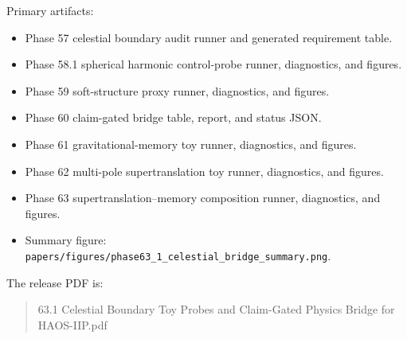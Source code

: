 \documentclass[11pt]{article}
\begin{document}
Primary artifacts:
\begin{itemize}
\item Phase 57 celestial boundary audit runner and generated requirement table.
\item Phase 58.1 spherical harmonic control-probe runner, diagnostics, and figures.
\item Phase 59 soft-structure proxy runner, diagnostics, and figures.
\item Phase 60 claim-gated bridge table, report, and status JSON.
\item Phase 61 gravitational-memory toy runner, diagnostics, and figures.
\item Phase 62 multi-pole supertranslation toy runner, diagnostics, and figures.
\item Phase 63 supertranslation--memory composition runner, diagnostics, and figures.
\item Summary figure: \texttt{papers/figures/phase63\_1\_celestial\_bridge\_summary.png}.
\end{itemize}

The release PDF is:
\begin{quote}
63.1 Celestial Boundary Toy Probes and Claim-Gated Physics Bridge for HAOS-IIP.pdf
\end{quote}
\end{document}
